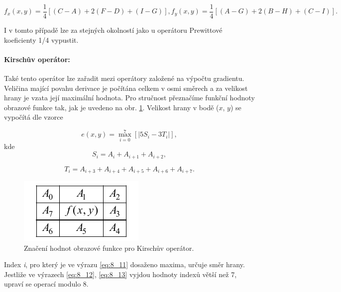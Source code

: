 \begin{equation} \label{eq:8_10}
    f_{x} \left(x,y\right)=\frac{1}{4} \left[\left(C-A\right)+2\left(F-D\right)+\left(I-G\right)\right],  f_{y} \left(x,y\right)=\frac{1}{4} \left[\left(A-G\right)+2\left(B-H\right)+\left(C-I\right)\right].  
\end{equation} 

I v tomto případě lze za stejných okolností jako u operátoru Prewittové koeficienty 1/4 vypustit.

\paragraph{Kirschův operátor:} Také tento operátor lze zařadit mezi operátory založené na výpočtu gradientu. Veličina mající povahu derivace je počítána celkem v osmi směrech a za velikost hrany je vzata její maximální hodnota. Pro stručnost přeznačíme funkční hodnoty obrazové funkce tak, jak je uvedeno na obr. \ref{img:8_5}. Velikost hrany v bodě ($x$, $y$) se vypočítá dle vzorce

\begin{equation} \label{eq:8_11}
    e\left(x,y\right)=\max\limits_{i=0}^{7} [|5S_{i} - 3T_{i} |],  
\end{equation}
kde
\begin{equation} \label{eq:8_12}
    S_{i} = A_{i} + A_{i+1} + A_{i+2},
\end{equation}

\begin{equation} \label{eq:8_13}
    T_{i} = A_{i+3} + A_{i+4} + A_{i+5} + A_{i+6} + A_{i+7}.
\end{equation}

\begin{figure}[th]
    \begin{center}
        \includegraphics[scale=1.0]{08_segmentace/images/img_8_5.pdf}
    \end{center}
    \caption{Značení hodnot obrazové funkce pro Kirschův operátor.}
    \label{img:8_5}
\end{figure}

Index \textit{i}, pro který je ve výrazu \eqref{eq:8_11} dosaženo maxima, určuje směr hrany. Jestliže ve výrazech \eqref{eq:8_12}, \eqref{eq:8_13} vyjdou hodnoty indexů větší než 7, upraví se operací modulo 8. 


